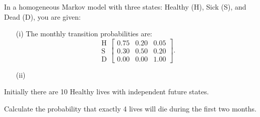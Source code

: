 In a homogeneous Markov model with three states: Healthy (H), Sick (S), and Dead (D), you are given:
\begin{itemize}
\item[(i)] The monthly transition probabilities are:
\[ \begin{array}{c} \text{H} \\ \text{S} \\ \text{D} \end{array}  \left[ \begin{array}{ccc} 0.75 & 0.20 & 0.05 \\ 0.30 & 0.50 & 0.20 \\ 0.00 & 0.00 & 1.00 \end{array}\right]. \]
\item[(ii)]
\end{itemize}
 Initially there are 10 Healthy lives with independent future states.

 Calculate the probability that exactly 4 lives will die during the first two months.




